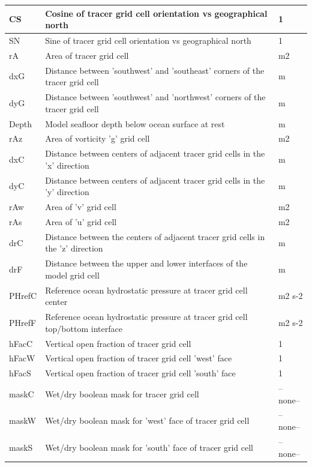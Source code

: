 \begin{longtable}{|m{}|m{}|m{}|}
CS &Cosine of tracer grid cell orientation vs geographical north &1  \\ \hline
SN &Sine of tracer grid cell orientation vs geographical north &1  \\ \hline
rA &Area of tracer grid cell &m2  \\ \hline
dxG &Distance between 'southwest' and 'southeast' corners of the tracer grid cell &m  \\ \hline
dyG &Distance between 'southwest' and 'northwest' corners of the tracer grid cell &m  \\ \hline
Depth &Model seafloor depth below ocean surface at rest &m  \\ \hline
rAz &Area of vorticity 'g' grid cell &m2  \\ \hline
dxC &Distance between centers of adjacent tracer grid cells in the 'x' direction &m  \\ \hline
dyC &Distance between centers of adjacent tracer grid cells in the 'y' direction &m  \\ \hline
rAw &Area of 'v' grid cell &m2  \\ \hline
rAs &Area of 'u' grid cell &m2  \\ \hline
drC &Distance between the centers of adjacent tracer grid cells in the 'z' direction &m  \\ \hline
drF &Distance between the upper and lower interfaces of the model grid cell &m  \\ \hline
PHrefC &Reference ocean hydrostatic pressure at tracer grid cell center &m2 s-2  \\ \hline
PHrefF &Reference ocean hydrostatic pressure at tracer grid cell top/bottom interface &m2 s-2  \\ \hline
hFacC &Vertical open fraction of tracer grid cell &1  \\ \hline
hFacW &Vertical open fraction of tracer grid cell 'west' face &1  \\ \hline
hFacS &Vertical open fraction of tracer grid cell 'south' face &1  \\ \hline
maskC &Wet/dry boolean mask for tracer grid cell &--none--  \\ \hline
maskW &Wet/dry boolean mask for 'west' face of tracer grid cell &--none--  \\ \hline
maskS &Wet/dry boolean mask for 'south' face of tracer grid cell &--none--  \\ \hline
\end{longtable}

\newp
\pagebreak
